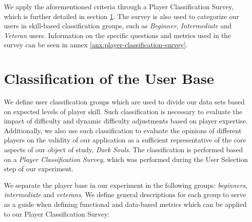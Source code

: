 We apply the aforementioned criteria through a Player Classification Survey, which is further detailed in section \ref{sec:user-base-classification}. The survey is also used to categorize our users in skill-based classification groups, such as \emph{Beginner}, \emph{Intermediate} and \emph{Veteran} users. Information on the specific questions and metrics used in the survey can be seen in annex \ref{anx:player-classification-survey}.


\section{Classification of the User Base}
\label{sec:user-base-classification}

We define user classification groups which are used to divide our data sets based on expected levels of player skill. Such classification is necessary to evaluate the impact of difficulty and dynamic difficulty adjustments based on player expertise. Additionally, we also use such classification to evaluate the opinions of different players on the validity of our application as a sufficient representative of the core aspects of our object of study, \emph{Dark Souls}. The classification is performed based on a \emph{Player Classification Survey}, which was performed during the User Selection step of our experiment.



We separate the player base in our experiment in the following groups: \emph{beginners}, \emph{intermediate} and \emph{veterans}. We define general descriptions for each group to serve as a guide when defining functional and data-based metrics which can be applied to our Player Classification Survey:


